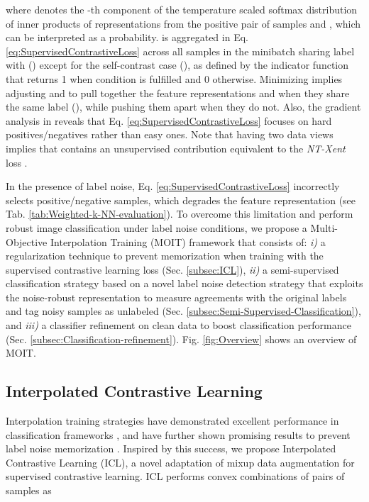 \documentclass[final]{cvpr}
\begin{document}
where  denotes the -th component of the temperature  scaled softmax distribution of inner products  of representations from the positive pair of samples  and , which can be interpreted as a probability.  is aggregated in Eq. \ref{eq:SupervisedContrastiveLoss} across all  samples  in the minibatch sharing label with  () except for the self-contrast case (), as defined by the indicator function  that returns 1 when condition  is fulfilled and 0 otherwise. Minimizing  implies adjusting  and  to pull together the feature representations  and  when they share the same label (), while pushing them apart when they do not. Also, the gradient analysis in \cite{2020_arXiv_SupContLearn} reveals that Eq. \ref{eq:SupervisedContrastiveLoss} focuses on hard positives/negatives rather than easy ones. Note that having two data views implies that  contains an unsupervised contribution equivalent to the \emph{NT-Xent} loss \cite{2020_ICML_SimCLR}. 

In the presence of label noise, Eq. \ref{eq:SupervisedContrastiveLoss} incorrectly selects positive/negative samples, which degrades the feature representation\textbf{ } (see Tab. \ref{tab:Weighted-k-NN-evaluation}).
To overcome this limitation and perform robust image classification under label noise conditions, we propose a Multi-Objective Interpolation Training (MOIT) framework that consists of: \emph{i)} a regularization technique to prevent memorization when training with the supervised contrastive learning loss (Sec. \ref{subsec:ICL}), \emph{ii)} a semi-supervised classification strategy based on a novel label noise detection strategy that exploits the noise-robust representation  to measure agreements with the original labels  and tag noisy samples as unlabeled (Sec. \ref{subsec:Semi-Supervised-Classification}), and \emph{iii)} a classifier refinement on clean data to boost classification performance (Sec. \ref{subsec:Classification-refinement}). Fig. \ref{fig:Overview} shows an overview of MOIT.

\subsection{Interpolated Contrastive Learning\label{subsec:ICL}}

Interpolation training strategies have demonstrated excellent performance
in classification frameworks \cite{2018_ICLR_mixup,2018_ACMl_RICAP,2019_ICCV_CutMix}, and have further shown promising results to prevent label noise memorization \cite{2018_ICLR_mixup,2019_ICML_DynamicBootstrapping,2020_ICLR_DivideMix,2020_ICML_DatasetOOD}. Inspired by this success, we propose Interpolated Contrastive Learning (ICL), a novel adaptation of mixup data augmentation \cite{2018_ICLR_mixup} for supervised contrastive learning. ICL performs convex combinations of pairs of samples as
\end{document}
